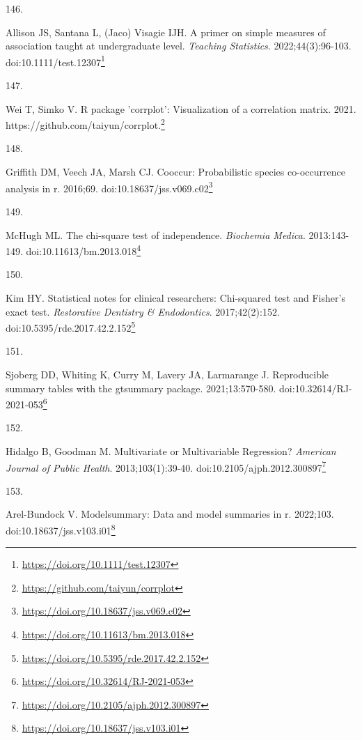 \documentclass[
  a4paper,
]{book}
\newlength{\cslhangindent}
\newlength{\csllabelwidth}
\newlength{\cslentryspacingunit} %
\newenvironment{CSLReferences}[2] %
 {%
  \setlength{\parindent}{0pt}
  \ifodd #1
  \let\oldpar\par
  \def\par{\hangindent=\cslhangindent\oldpar}
  \fi
  \setlength{\parskip}{#2\cslentryspacingunit}
 }%
 {}
\newcommand{\CSLLeftMargin}[1]{\parbox[t]{\csllabelwidth}{#1}}
\newcommand{\CSLRightInline}[1]{\parbox[t]{\linewidth - \csllabelwidth}{#1}\break}
\renewcommand{\href}[2]{#2\footnote{\url{#1}}}
\begin{document}
\begin{CSLReferences}{0}{0}
\leavevmode{}%
\CSLLeftMargin{146. }%
\CSLRightInline{Allison JS, Santana L, (Jaco) Visagie IJH. A primer on simple measures of association taught at undergraduate level. \emph{Teaching Statistics}. 2022;44(3):96-103. doi:\href{https://doi.org/10.1111/test.12307}{10.1111/test.12307}}

\leavevmode{}%
\CSLLeftMargin{147. }%
\CSLRightInline{Wei T, Simko V. R package 'corrplot': Visualization of a correlation matrix. 2021. \href{https://github.com/taiyun/corrplot}{https://github.com/taiyun/corrplot.}}

\leavevmode{}%
\CSLLeftMargin{148. }%
\CSLRightInline{Griffith DM, Veech JA, Marsh CJ. {\textbraceleft}Cooccur{\textbraceright}: Probabilistic species co-occurrence analysis in {\textbraceleft}r{\textbraceright}. 2016;69. doi:\href{https://doi.org/10.18637/jss.v069.c02}{10.18637/jss.v069.c02}}

\leavevmode{}%
\CSLLeftMargin{149. }%
\CSLRightInline{McHugh ML. The chi-square test of independence. \emph{Biochemia Medica}. 2013:143-149. doi:\href{https://doi.org/10.11613/bm.2013.018}{10.11613/bm.2013.018}}

\leavevmode{}%
\CSLLeftMargin{150. }%
\CSLRightInline{Kim HY. Statistical notes for clinical researchers: Chi-squared test and Fisher's exact test. \emph{Restorative Dentistry \& Endodontics}. 2017;42(2):152. doi:\href{https://doi.org/10.5395/rde.2017.42.2.152}{10.5395/rde.2017.42.2.152}}

\leavevmode{}%
\CSLLeftMargin{151. }%
\CSLRightInline{Sjoberg DD, Whiting K, Curry M, Lavery JA, Larmarange J. Reproducible summary tables with the gtsummary package. 2021;13:570-580. doi:\href{https://doi.org/10.32614/RJ-2021-053}{10.32614/RJ-2021-053}}

\leavevmode{}%
\CSLLeftMargin{152. }%
\CSLRightInline{Hidalgo B, Goodman M. Multivariate or Multivariable Regression? \emph{American Journal of Public Health}. 2013;103(1):39-40. doi:\href{https://doi.org/10.2105/ajph.2012.300897}{10.2105/ajph.2012.300897}}

\leavevmode{}%
\CSLLeftMargin{153. }%
\CSLRightInline{Arel-Bundock V. {\textbraceleft}Modelsummary{\textbraceright}: Data and model summaries in {\textbraceleft}r{\textbraceright}. 2022;103. doi:\href{https://doi.org/10.18637/jss.v103.i01}{10.18637/jss.v103.i01}}


\end{CSLReferences}
\end{document}
